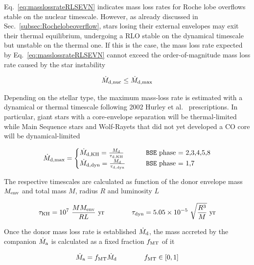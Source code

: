 \documentclass[a4paper,titlepage]{book}     	%
\newcommand{\mdot}{\ensuremath{\dot{M}}}
\newcommand{\yr}{\text{yr}}
\begin{document}
Eq.\ \ref{eq:masslossrateRLSEVN} indicates mass loss rates for Roche lobe overflows stable on the nuclear timescale. However, as already discussed in Sec.\ \ref{subsec:Rochelobeoverflow}, stars losing their external envelopes may exit their thermal equilibrium, undergoing a RLO stable on the dynamical timescale but unstable on the thermal one. If this is the case, the mass loss rate expected by Eq.\ \ref{eq:masslossrateRLSEVN} cannot exceed the order-of-magnitude mass loss rate caused by the star instability

\begin{equation}
    \mdot_{\rm d, nuc} \leq \mdot_{\rm d, max}
\end{equation}

Depending on the stellar type, the maximum mass-loss rate is estimated with a dynamical or thermal timescale following 2002 Hurley et al.\ \cite{Hurley2002} prescriptions. In particular, giant stars with a core-envelope separation will be thermal-limited while Main Sequence stars and Wolf-Rayets that did not yet developed a CO core will be dynamical-limited

\begin{equation}
    \mdot_{\rm d, max} = 
    \begin{cases}
        \mdot_{\rm d, KH} = \frac{M_{\rm d}}{\tau_{\rm d, KH}}   & \qquad \texttt{BSE} ~\text{phase = 2,3,4,5,8} \\
        \mdot_{\rm d, dyn} = \frac{M_{\rm d}}{\tau_{\rm d, dyn}} & \qquad \texttt{BSE}~\text{phase = 1,7}
    \end{cases}
\end{equation}

The respective timescales are calculated as function of the donor envelope mass $M_{\rm env}$ and total mass $M$, radius $R$ and luminosity $L$

\begin{equation}
    \tau_{\rm KH} = 10^7 ~\frac{M M_{\rm env}}{RL}~\yr \qquad \qquad \tau_{\rm dyn} = 5.05 \times 10^{-5}~ \sqrt{\frac{R^3}{M}}~\yr
\end{equation}

Once the donor mass loss rate is established $\mdot_{\rm d}$, the mass accreted by the companion $\mdot_{\rm a}$ is calculated as a fixed fraction $f_{\rm MT}$ of it

\begin{equation}\label{eq:accretionrateSEVN}
    \mdot_{\rm a} = f_{\rm MT} \mdot_{\rm d} \qquad \qquad f_{\rm MT} \in [0,1]
\end{equation}
\end{document}
